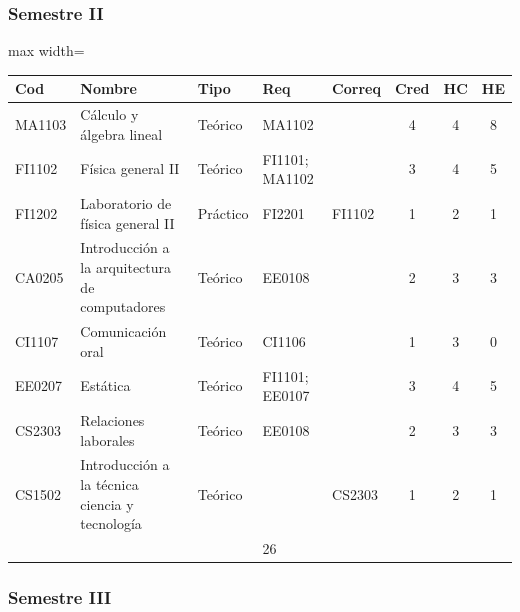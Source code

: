\subsubsection*{Semestre II}

\begin{center}
\small
\begin{adjustbox}{max width=\textwidth}
\begin{tabular}{|>{\RaggedRight\arraybackslash}p{1.25cm}|>{\RaggedRight\arraybackslash}p{5.2cm}|>{\RaggedRight\arraybackslash}p{1.65cm}|p{1.25cm}|p{1.25cm}|c|c|c|}
\hline
\rowcolor{grisEncabezado}
Cod & Nombre & Tipo & Req & Correq & Cred & HC & HE \\ \hline
MA1103 & Cálculo y álgebra lineal & Teórico & MA1102 &  & 4 & 4 & 8 \\ \hline
\rowcolor{azulTabla}
FI1102 & Física general II & Teórico & FI1101; MA1102 &  & 3 & 4 & 5 \\ \hline
FI1202 & Laboratorio de física general II & Práctico & FI2201 & FI1102 & 1 & 2 & 1 \\ \hline
\rowcolor{azulTabla}
CA0205 & Introducción a la arquitectura de computadores & Teórico & EE0108 &  & 2 & 3 & 3 \\ \hline
CI1107 & Comunicación oral & Teórico & CI1106 &  & 1 & 3 & 0 \\ \hline
\rowcolor{azulTabla}
EE0207 & Estática & Teórico & FI1101; EE0107 &  & 3 & 4 & 5 \\ \hline
CS2303 & Relaciones laborales & Teórico & EE0108 &  & 2 & 3 & 3 \\ \hline
\rowcolor{azulTabla}
CS1502 & Introducción a la técnica ciencia y tecnología & Teórico &  & CS2303 & 1 & 2 & 1 \\ \hline
\multicolumn{5}{|l|}{Total} & 17 & 25 & 26 \\ \hline
\end{tabular}
\end{adjustbox}
\end{center}

\subsubsection*{Semestre III}

